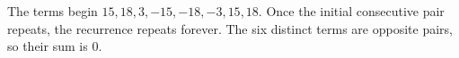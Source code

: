 The terms begin $15,18,3,-15,-18,-3,15,18$. Once the initial consecutive pair repeats, the recurrence repeats forever. The six distinct terms are opposite pairs, so their sum is $\boxed 0$.
